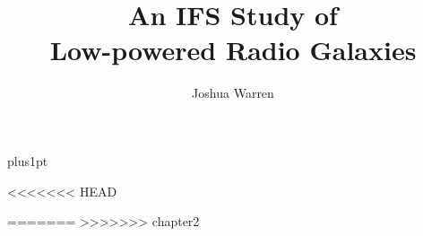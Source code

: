 \documentclass[12pt]{ociamthesis}  %
\title{An IFS Study of\\[1ex]     %
        Low-powered Radio Galaxies}   %
\author{Joshua Warren}             %
\begin{document}
\baselineskip=18pt plus1pt

\setcounter{secnumdepth}{3}
\setcounter{tocdepth}{3}


\maketitle                  %

\begin{romanpages}          %

	\tableofcontents            %
	\listoffigures              %
\end{romanpages}            %



<<<<<<< HEAD

=======
>>>>>>> chapter2




\appendix

% 

\end{document}
